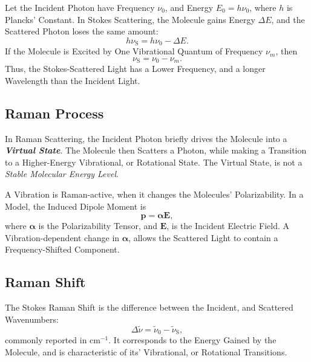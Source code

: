 \documentclass[a4paper, 10pt, onepage]{elegantbook}
\begin{document}
{\noindent

Let the Incident Photon have Frequency $\nu_0$, and Energy $E_0=h\nu_0$, where $h$ is Plancks' Constant. In Stokes 
Scattering, the Molecule gains Energy $\Delta E$, and the Scattered Photon loses the same amount:
\begin{equation}
  h\nu_{\mathrm{S}} = h\nu_0-\Delta E.
\end{equation}
If the Molecule is Excited by One Vibrational Quantum of Frequency $\nu_m$, then
\begin{equation}
  \nu_{\mathrm{S}} = \nu_0-\nu_m.
\end{equation}
Thus, the Stokes-Scattered Light has a Lower Frequency, and a longer Wavelength than the Incident Light.  

\subsection{Raman Process}

In Raman Scattering, the Incident Photon briefly drives the Molecule into a \emph{\textbf{Virtual State}}. The Molecule 
then Scatters a Photon, while making a Transition to a Higher-Energy Vibrational, or Rotational State. The Virtual 
State, is not a \emph{Stable Molecular Energy Level}.  

A Vibration is Raman-active, when it changes the Molecules' Polarizability. In a Model, the Induced Dipole Moment is
\begin{equation}
  \mathbf{p}=\boldsymbol{\alpha}\mathbf{E},
\end{equation}
where $\boldsymbol{\alpha}$ is the Polarizability Tensor, and $\mathbf{E}$, is the Incident Electric Field. A 
Vibration-dependent change in $\boldsymbol{\alpha}$, allows the Scattered Light to contain a Frequency-Shifted 
Component.  

\subsection{Raman Shift}

\noindent

The Stokes Raman Shift is the difference between the Incident, and Scattered Wavenumbers:
\begin{equation}
  \Delta\tilde{\nu}
  = \tilde{\nu}_0-\tilde{\nu}_{\mathrm{S}},
\end{equation}
commonly reported in $\mathrm{cm}^{-1}$. It corresponds to the Energy Gained by the Molecule, and is characteristic of 
its' Vibrational, or Rotational Transitions.  

}
\end{document}
